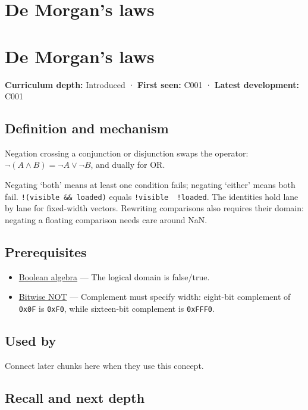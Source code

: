 \hypertarget{appendix-9079d3659da4}{}
\section*{De Morgan's laws}
\section{De Morgan's laws}\label{de-morgans-laws}

\textbf{Curriculum depth:} Introduced · \textbf{First seen:} C001 · \textbf{Latest development:} C001

\subsection{Definition and mechanism}\label{definition-and-mechanism}

Negation crossing a conjunction or disjunction swaps the operator: \(\neg(A\land B)=\neg A\lor\neg B\), and dually for OR.

Negating `both' means at least one condition fails; negating `either' means both fail. \texttt{!(visible\ \&\&\ loaded)} equals \texttt{!visible\ \textbar{}\textbar{}\ !loaded}. The identities hold lane by lane for fixed-width vectors. Rewriting comparisons also requires their domain: negating a floating comparison needs care around NaN.

\subsection{Prerequisites}\label{prerequisites}

\begin{itemize}
\tightlist
\item
  \hyperref[appendix-24475e1596a8]{Boolean algebra} --- The logical domain is false/true.
\item
  \hyperref[appendix-8f38927cfc54]{Bitwise NOT} --- Complement must specify width: eight-bit complement of \texttt{0x0F} is \texttt{0xF0}, while sixteen-bit complement is \texttt{0xFFF0}.
\end{itemize}

\subsection{Used by}\label{used-by}

Connect later chunks here when they use this concept.

\subsection{Recall and next depth}\label{recall-and-next-depth}

